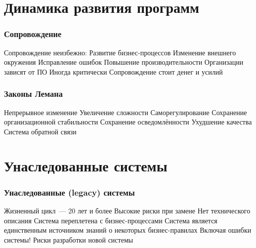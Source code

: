 \documentclass{../../slides-style}
\begin{document}
    \begin{frame}[plain]
        \titlepage
    \end{frame}

    \section{Динамика развития программ}

    \begin{frame}
        \frametitle{Сопровождение}
        \begin{outline}
            \1 Сопровождение неизбежно:
                \2 Развитие бизнес-процессов
                \2 Изменение внешнего окружения
                \2 Исправление ошибок
                \2 Повышение производительности
            \1 Организации зависят от ПО
                \2 Иногда критически
            \1 Сопровождение стоит денег и усилий
        \end{outline}
    \end{frame}

    \begin{frame}
        \frametitle{Законы Лемана}
        \begin{outline}
            \1 Непрерывное изменение
            \1 Увеличение сложности
            \1 Саморегулирование
            \1 Сохранение организационной стабильности
            \1 Сохранение осведомлённости
            \1 Ухудшение качества
            \1 Система обратной связи
        \end{outline}
    \end{frame}

    \section{Унаследованные системы}

    \begin{frame}
        \frametitle{Унаследованные (legacy) системы}
        \begin{outline}
            \1 Жизненный цикл~--- 20 лет и более
            \1 Высокие риски при замене
                \2 Нет технического описания
                \2 Система переплетена с бизнес-процессами
                \2 Система является единственным источником знаний о некоторых бизнес-правилах
                    \3 Включая ошибки системы!
                \2 Риски разработки новой системы
        \end{outline}
    \end{frame}
\end{document}
